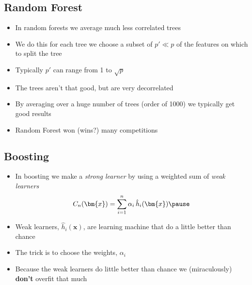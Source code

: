 
\begin{slide}
\section{Random Forest}

\begin{PauseHighLight}
  \begin{itemize}
  \item In random forests we average much less correlated trees\pause
  \item We do this for each tree we choose a subset of $p'\ll p$ of the
    features on which to split the tree\pause
  \item Typically $p'$ can range from 1 to $\sqrt{p}$\pause
  \item The trees aren't that good, but are very decorrelated\pause
  \item By averaging over a huge number of trees (order of 1000) we
    typically get good results\pause
  \item Random Forest won (wins?) many competitions\pause
  \end{itemize}
\end{PauseHighLight}

\end{slide}

\Outline %

\begin{slide}
\section{Boosting}

\begin{PauseHighLight}
  \begin{itemize}
  \item In boosting we make a \emph{strong learner} by using a weighted
    sum of \emph{weak learners}
    \begin{align*}
      C_n(\bm{x}) = \sum_{i=1}^n \alpha_i \, \hat{h}_i(\bm{x})\pause
    \end{align*}
  \item Weak learners, $\hat{h}_i(\bm{x})$, are learning machine that do a
    little better than chance\pause
  \item The trick is to choose the weights, $\alpha_i$\pause
  \item Because the weak learners do little better than chance we
    (miraculously) \textbf{don't} overfit\pause{} that much\pauseb
  \end{itemize}
\end{PauseHighLight}

\end{slide}

